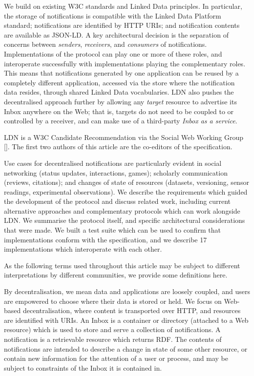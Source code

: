 \documentclass[a4paper]{llncs}
\begin{document}
\par We build on existing W3C standards and Linked Data principles. In particular, the storage of notifications is compatible with the Linked Data Platform standard; notifications are identified by HTTP URIs; and notification contents are available as JSON-LD. A key architectural decision is the separation of concerns between {\em senders}, {\em receivers}, and {\em consumers} of notifications. Implementations of the protocol can play one or more of these roles, and interoperate successfully with implementations playing the complementary roles. This means that notifications generated by one application can be reused by a completely different application, accessed via the store where the notification data resides, through shared Linked Data vocabularies. LDN also pushes the decentralised approach further by allowing any {\em target} resource to advertise its Inbox anywhere on the Web; that is, targets do not need to be coupled to or controlled by a receiver, and can make use of a third-party {\em Inbox as a service}.


\par LDN is a W3C \empty Candidate Recommendation via the \empty Social Web Working Group []. The first two authors of this article are the co-editors of the specification.


\par Use cases for decentralised notifications are particularly evident in social networking (status updates, interactions, games); scholarly communication (reviews, citations); and changes of state of resources (datasets, versioning, sensor readings, experimental observations). We describe the requirements which guided the development of the protocol and discuss related work, including current alternative approaches and complementary protocols which can work alongside LDN. We summarise the protocol itself, and specific architectural considerations that were made. We built a test suite which can be used to confirm that implementations conform with the specification, and we describe 17 implementations which interoperate with each other.



\par As the following terms used throughout this article may be subject to different interpretations by different communities, we provide some definitions here.


\par By decentralisation, we mean data and applications are loosely coupled, and users are empowered to choose where their data is stored or held. We focus on Web-based decentralisation, where content is transported over HTTP, and resources are identified with URIs. An Inbox is a container or directory (attached to a Web resource) which is used to store and serve a collection of notifications. A notification is a retrievable resource which returns RDF. The contents of notifications are intended to describe a change in state of some other resource, or contain new information for the attention of a user or process, and may be subject to constraints of the Inbox it is contained in.
\end{document}
